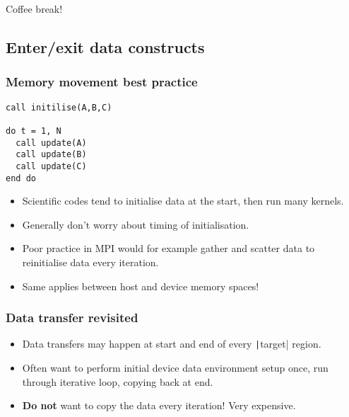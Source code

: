 \documentclass[aspectratio=169]{beamer}
\begin{document}
  \begin{frame}
  \begin{block}{Coffee break!}
  \end{block}
  \end{frame}


%  
%  
%  
%  
%

\subsection{Enter/exit data constructs}
\begin{frame}[fragile]
\frametitle{Memory movement best practice}

\begin{verbatim}
call initilise(A,B,C)

do t = 1, N
  call update(A)
  call update(B)
  call update(C)
end do
\end{verbatim}

\begin{itemize}
  \item Scientific codes tend to initialise data at the start, then run many kernels.
  \item Generally don't worry about timing of initialisation.
  \item Poor practice in MPI would for example gather and scatter data to reinitialise data every iteration.
  \item Same applies between host and device memory spaces!
\end{itemize}

\end{frame}

\begin{frame}
\frametitle{Data transfer revisited}
\begin{itemize}
\item Data transfers may happen at start and end of every \texttt|target| region.
  \item Often want to perform initial device data environment setup once, run through iterative loop, copying back at end.
  \item \textbf{Do not} want to copy the data every iteration! Very expensive.
\end{itemize}

\end{frame}
\end{document}
